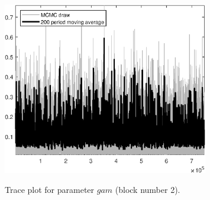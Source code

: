 \begin{figure}[H]
\centering
  \includegraphics[width=0.8\textwidth]{directed_search_est/graphs/TracePlot_gam_blck_2}\\
    \caption{Trace plot for parameter $gam$ (block number 2).}
\end{figure}

